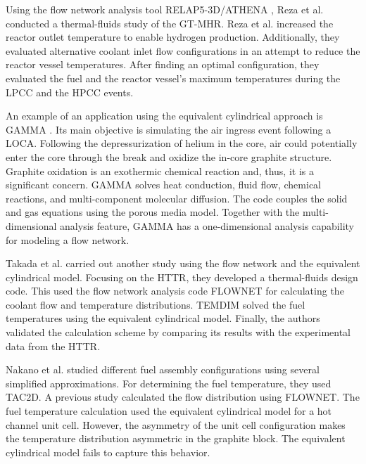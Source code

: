 Using the flow network analysis tool RELAP5-3D/ATHENA \cite{inl_relap5-3dathena_2005}, Reza et al. \cite{reza_design_2006} conducted a thermal-fluids study of the GT-MHR.
Reza et al. increased the reactor outlet temperature to enable hydrogen production.
Additionally, they evaluated alternative coolant inlet flow configurations in an attempt to reduce the reactor vessel temperatures.
After finding an optimal configuration, they evaluated the fuel and the reactor vessel's maximum temperatures during the \gls{LPCC} and the \gls{HPCC} events.

An example of an application using the equivalent cylindrical approach is GAMMA \cite{no_multi-component_2007}.
Its main objective is simulating the air ingress event following a LOCA.
Following the depressurization of helium in the core, air could potentially enter the core through the break and oxidize the in-core graphite structure.
Graphite oxidation is an exothermic chemical reaction and, thus, it is a significant concern.
GAMMA solves heat conduction, fluid flow, chemical reactions, and multi-component molecular diffusion.
The code couples the solid and gas equations using the porous media model.
Together with the multi-dimensional analysis feature, GAMMA has a one-dimensional analysis capability for  modeling a flow network.

Takada et al. \cite{takada_core_2004} carried out another study using the flow network and the equivalent cylindrical model.
Focusing on the \gls{HTTR}, they developed a thermal-fluids design code.
This used the flow network analysis code FLOWNET \cite{maruyama_verification_1988} for calculating the coolant flow and temperature distributions.
TEMDIM \cite{maruyama_verification_1988} solved the fuel temperatures using the equivalent cylindrical model.
Finally, the authors validated the calculation scheme by comparing its results with the experimental data from the \gls{HTTR}.

Nakano et al. \cite{nakano_conceptual_2008} studied different fuel assembly configurations using several simplified approximations.
For determining the fuel temperature, they used TAC2D.
A previous study calculated the flow distribution using FLOWNET.
The fuel temperature calculation used the equivalent cylindrical model for a hot channel unit cell.
However, the asymmetry of the unit cell configuration makes the temperature distribution asymmetric in the graphite block.
The equivalent cylindrical model fails to capture this behavior.


